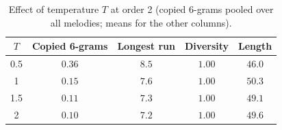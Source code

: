 \begin{table}[t]
  \centering
  \small
  \setlength{\tabcolsep}{4pt}
  \begin{tabular}{ccccc}
    \toprule
    $T$ & Copied 6-grams & Longest run & Diversity & Length \\
    \midrule
    0.5 & $0.36$ & $8.5$ & $1.00$ & $46.0$ \\
    1 & $0.15$ & $7.6$ & $1.00$ & $50.3$ \\
    1.5 & $0.11$ & $7.3$ & $1.00$ & $49.1$ \\
    2 & $0.10$ & $7.2$ & $1.00$ & $49.6$ \\
    \bottomrule
  \end{tabular}
  \caption{Effect of temperature $T$ at order 2 (copied 6-grams pooled over all melodies; means for the other columns).}
  \label{tab:temperature}
\end{table}
